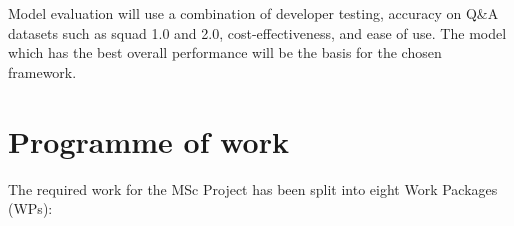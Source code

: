 \documentclass{article}
\begin{document}
Model evaluation will use a combination of developer testing, accuracy on Q\&A datasets such as \acrshort{squad} 1.0 and 2.0, cost-effectiveness, and ease of use. The model which has the best overall performance will be the basis for the chosen framework. 

\section{Programme of work}
The required work for the MSc Project has been split into eight Work Packages (WPs):
\end{document}
